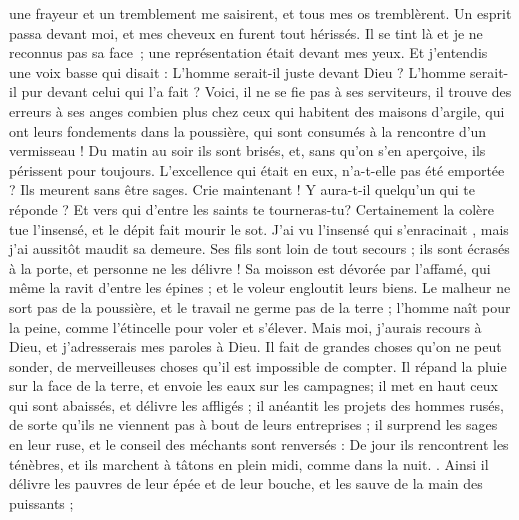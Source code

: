 \begin{multicols}{2}
une frayeur et un tremblement me saisirent, et tous mes os tremblèrent.
Un esprit passa devant moi, et mes cheveux en furent tout hérissés. 
Il se tint là et je ne reconnus pas sa face ; une représentation était devant mes yeux. Et j'entendis une voix basse qui disait :
L'homme serait-il juste devant Dieu ? L'homme serait-il pur devant celui qui l'a fait ?
Voici, il ne se fie pas à ses serviteurs, il trouve des erreurs à ses anges
combien plus chez ceux qui habitent des maisons d'argile, qui ont leurs fondements dans la poussière, qui sont consumés à la rencontre d'un vermisseau !
Du matin au soir ils sont brisés, et, sans qu'on s'en aperçoive, ils périssent pour toujours. 
L'excellence qui était en eux, n'a-t-elle pas été emportée ? Ils meurent sans être sages. 
\VerseOne{}Crie maintenant ! Y aura-t-il quelqu'un qui te réponde ? Et vers qui d'entre les saints te tourneras-tu?
Certainement la colère tue l'insensé, et le dépit fait mourir le sot.
J'ai vu l'insensé qui s'enracinait , mais j'ai aussitôt maudit sa demeure.
Ses fils sont loin de tout secours ; ils sont écrasés à la porte, et personne ne les délivre !
 Sa moisson est dévorée par l'affamé, qui même la ravit d'entre les épines ; et le voleur engloutit leurs biens.
Le malheur ne sort pas de la poussière, et le travail ne germe pas de la terre ;
l'homme naît pour la peine, comme l'étincelle pour voler et s'élever.
Mais moi, j'aurais recours à Dieu, et j'adresserais mes paroles à Dieu.
Il fait de grandes choses qu'on ne peut sonder, de merveilleuses choses qu'il est impossible de compter.
Il répand la pluie sur la face de la terre, et envoie les eaux sur les campagnes;
il met en haut ceux qui sont abaissés, et délivre les affligés ;
il anéantit les projets des hommes rusés, de sorte qu'ils ne viennent pas à bout de leurs entreprises ;
il surprend les sages en leur ruse, et le conseil des méchants sont renversés :
De jour ils rencontrent les ténèbres, et ils marchent à tâtons en plein midi, comme dans la nuit.
.
Ainsi il délivre les pauvres de leur épée et de leur bouche, et les sauve de la main des puissants ;

\end{multicols}
